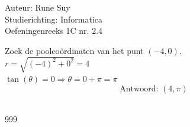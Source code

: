 \documentclass[a4paper]{article}
\begin{document}
  
\noindent \large Auteur: Rune Suy \\
\noindent \large Studierichting: Informatica\\
\noindent \large Oefeningenreeks 1C nr. 2.4\\

\medskip

\normalsize

Zoek de poolcoördinaten van het punt $(-4, 0)$.\\

$ r = \sqrt{(-4)^2 + 0^2} = 4 $\\

$ \tan(\theta) = 0 \Rightarrow \theta = 0 + \pi = \pi $\\

$$ \text{Antwoord: }(4,\pi) $$\\

\begin{thebibliography}{999}
\end{thebibliography}
\end{document}
